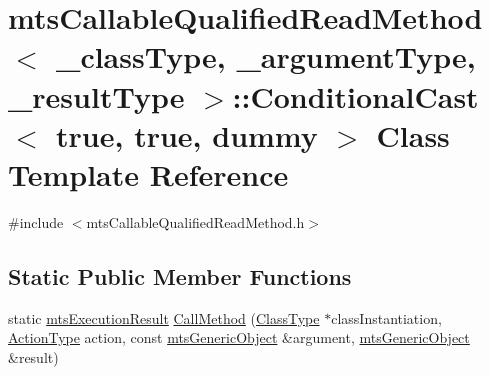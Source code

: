 \hypertarget{classmts_callable_qualified_read_method_1_1_conditional_cast_3_01true_00_01true_00_01dummy_01_4}{\section{mts\-Callable\-Qualified\-Read\-Method$<$ \-\_\-class\-Type, \-\_\-argument\-Type, \-\_\-result\-Type $>$\-:\-:Conditional\-Cast$<$ true, true, dummy $>$ Class Template Reference}
\label{classmts_callable_qualified_read_method_1_1_conditional_cast_3_01true_00_01true_00_01dummy_01_4}
}


{\ttfamily \#include $<$mts\-Callable\-Qualified\-Read\-Method.\-h$>$}

\subsection*{Static Public Member Functions}
\begin{DoxyCompactItemize}
\item 
static \hyperlink{classmts_execution_result}{mts\-Execution\-Result} \hyperlink{classmts_callable_qualified_read_method_1_1_conditional_cast_3_01true_00_01true_00_01dummy_01_4_afebded2ba9c6c10ef311e04bea48d5d4}{Call\-Method} (\hyperlink{classmts_callable_qualified_read_method_a6cfee5c3c3c49c691c2f5176ea79d735}{Class\-Type} $\ast$class\-Instantiation, \hyperlink{classmts_callable_qualified_read_method_ac6fc895837df0b66d84405f3ee01f153}{Action\-Type} action, const \hyperlink{classmts_generic_object}{mts\-Generic\-Object} \&argument, \hyperlink{classmts_generic_object}{mts\-Generic\-Object} \&result)
\end{DoxyCompactItemize}


